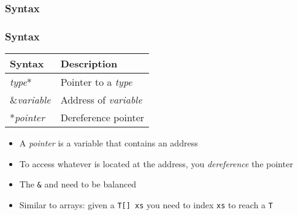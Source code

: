 \begin{frame}
  \frametitle{Syntax}
  \vskip5mm

\end{frame}

\begin{frame}
  \frametitle{Syntax}
  \begin{center}
    \begin{tabular}{ll}
      \textbf{Syntax}  & \textbf{Description} \\
      \toprule
      {\it type}*      & Pointer to a {\it type} \\
      \&{\it variable} & Address of {\it variable} \\
      *{\it pointer}   & Dereference pointer \\
    \end{tabular}
  \end{center}
  \begin{itemize}
    \item A \emph{pointer} is a variable that contains an address
    \item To access whatever is located at the address, you \emph{dereference} the pointer
    \item The {\tt \&} and {\tt *} need to be balanced
    \item Similar to arrays: given a {\tt T[] xs} you need to index {\tt xs} to reach a {\tt T}
  \end{itemize}
\end{frame}

